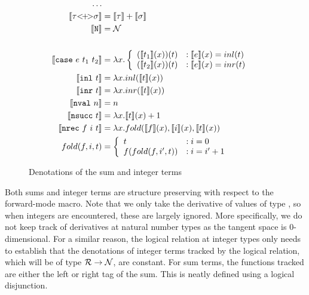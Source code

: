   \begin{figure}
    \centering
    \begin{equation*}
      \begin{split}
        \dots \\
        \llbracket \tau {<}\!{+}\!{>} \sigma \rrbracket &= \llbracket \tau \rrbracket + \llbracket \sigma \rrbracket \\
        \llbracket \texttt{N} \rrbracket &= \mathcal{N} \\
        \\
        \llbracket \texttt{case}\ e\ t_1\ t_2 \rrbracket &= \lambda x.
          \left\{
            \begin{array}{ll}
              (\llbracket t_1 \rrbracket(x))(t)
                & : \llbracket e \rrbracket(x) = inl(t) \\
              (\llbracket t_2 \rrbracket(x))(t)
                & : \llbracket e \rrbracket(x) = inr(t) \\
            \end{array}
          \right. \\
        \llbracket \texttt{inl}\ t \rrbracket &= \lambda x. inl(\llbracket t \rrbracket(x)) \\
        \llbracket \texttt{inr}\ t \rrbracket &= \lambda x. inr(\llbracket t \rrbracket(x)) \\
        \llbracket \texttt{nval}\ n \rrbracket &= n \\
        \llbracket \texttt{nsucc}\ t \rrbracket &= \lambda x. \llbracket t \rrbracket(x) + 1 \\
        \llbracket \texttt{nrec}\ f\ i\ t \rrbracket &= \lambda x. fold(\llbracket f \rrbracket(x), \llbracket i \rrbracket(x), \llbracket t \rrbracket(x)) \\
        fold(f, i, t) &=
          \left\{
            \begin{array}{ll}
              t &: i = 0 \\
              f(fold(f, i', t))
                &: i = i' + 1 \\
            \end{array}
          \right. \\
      \end{split}
    \end{equation*}
    \caption{Denotations of the sum and integer terms}
    \label{eqn:denotation_sums_prim}
  \end{figure}

  Both sums and integer terms are structure preserving with respect to the forward-mode macro.
  Note that we only take the derivative of values of type \synR, so when integers are encountered, these are largely ignored.
  More specifically, we do not keep track of derivatives at natural number types as the tangent space is $0$-dimensional.
  For a similar reason, the logical relation at integer types only needs to establish that the denotations of integer terms tracked by the logical relation, which will be of type $\mathcal{R} \to \mathcal{N}$, are constant.
  For sum terms, the functions tracked are either the left or right tag of the sum.
  This is neatly defined using a logical disjunction.

